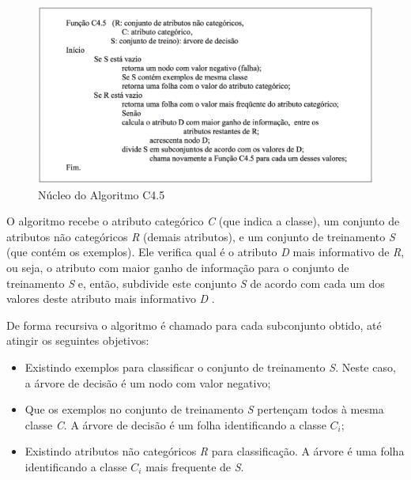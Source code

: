 \documentclass[
	12pt,				%
	openright,			%
	oneside,	
	a4paper,				%
	english,				%
	brazil				%
]{abntex2/abntex2} %
\begin{document}
		\begin{figure}[!htb]
			\caption{\label{fignucleoC45} Núcleo do Algoritmo C4.5}
			\begin{center}
				\includegraphics[scale=0.4]{img/nucleoC45.png}
			\end{center}
		\end{figure}
	
	O algoritmo recebe o atributo categórico \textit{C} (que indica a classe), um conjunto de atributos não categóricos \textit{R} (demais atributos), e um conjunto de treinamento \textit{S} (que contém os exemplos). Ele verifica qual é o atributo \textit{D} mais informativo de \textit{R}, ou seja, o atributo com maior ganho de informação para o conjunto de treinamento \textit{S} e, então, subdivide este conjunto \textit{S} de acordo com cada um dos valores deste atributo mais informativo \textit{D} \cite{feldens:1997}.
	
	De forma recursiva o algoritmo é chamado para cada subconjunto obtido, até atingir os seguintes objetivos:
	
	\begin{itemize}
		\item Existindo exemplos para classificar o conjunto de treinamento \textit{S}. Neste caso, a árvore de decisão é um nodo com valor negativo;
		\item Que os exemplos no conjunto de treinamento \textit{S} pertençam todos à mesma classe \textit{C}. A árvore de decisão é um folha identificando a classe \textit{$C_i$};
		\item Existindo atributos não categóricos \textit{R} para classificação. A árvore é uma folha identificando a classe \textit{$C_i$} mais frequente de \textit{S}.
	\end{itemize}
	
\end{document}
